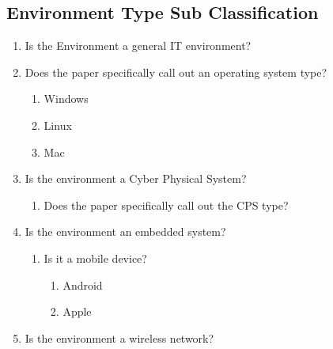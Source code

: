 \documentclass[10pt]{IEEEtran}
\begin{document}
\subsection{Environment Type Sub Classification}
\begin{enumerate}
    \item Is the Environment a general IT environment?
    \item Does the paper specifically call out an operating system type?
    \begin{enumerate}
        \item Windows
        \item Linux
        \item Mac
    \end{enumerate}
    \item Is the environment a Cyber Physical System?
        \begin{enumerate}
            \item Does the paper specifically call out the CPS type?
        \end{enumerate}
    \item Is the environment an embedded system?
        \begin{enumerate}
            \item Is it a mobile device?
            \begin{enumerate}
                    \item Android
                    \item Apple
            \end{enumerate}
        \end{enumerate}
    \item Is the environment a wireless network?
\end{enumerate}
\end{document}
